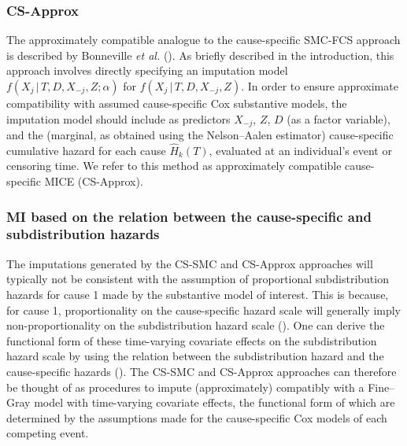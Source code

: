 \documentclass[
  letterpaper,
  paper=240mm:170mm,
  twoside=true,
  open=right,
  fontsize=10pt,
  pagesize=false,
  BCOR=15mm,
  DIV=14,
  headinclude=true,
  footinclude=false,
  headsepline=on]{scrbook}
\newcommand{\given}{\,|\,}
\begin{document}
\subsubsection{CS-Approx}\label{sec-cs-approx}

The approximately compatible analogue to the cause-specific SMC-FCS
approach is described by Bonneville \emph{et al.}
(). As
briefly described in the introduction, this approach involves directly
specifying an imputation model \(f(X_j \given T, D, X_{-j}, Z;\alpha)\)
for \(f(X_j \given T, D, X_{-j}, Z)\). In order to ensure approximate
compatibility with assumed cause-specific Cox substantive models, the
imputation model should include as predictors \(X_{-j}\), \(Z\), \(D\)
(as a factor variable), and the (marginal, as obtained using the
Nelson--Aalen estimator) cause-specific cumulative hazard for each cause
\(\hat{H}_k(T)\), evaluated at an individual's event or censoring time.
We refer to this method as approximately compatible cause-specific MICE
(CS-Approx).

\subsubsection{MI based on the relation between the cause-specific and
subdistribution
hazards}\label{mi-based-on-the-relation-between-the-cause-specific-and-subdistribution-hazards}

The imputations generated by the CS-SMC and CS-Approx approaches will
typically not be consistent with the assumption of proportional
subdistribution hazards for cause 1 made by the substantive model of
interest. This is because, for cause 1, proportionality on the
cause-specific hazard scale will generally imply non-proportionality on
the subdistribution hazard scale
(). One can derive the functional form of these
time-varying covariate effects on the subdistribution hazard scale by
using the relation between the subdistribution hazard and the
cause-specific hazards
(). The CS-SMC and CS-Approx approaches can therefore be
thought of as procedures to impute (approximately) compatibly with a
Fine--Gray model with time-varying covariate effects, the functional
form of which are determined by the assumptions made for the
cause-specific Cox models of each competing event.
\end{document}
